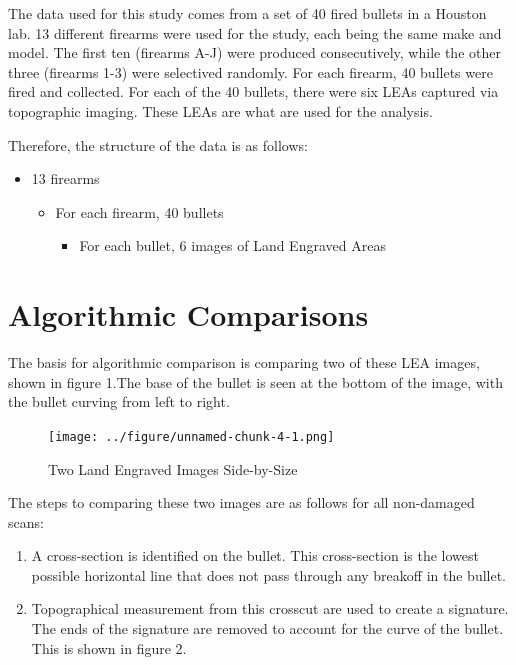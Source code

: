 \documentclass[
  number]{elsarticle}
\providecommand{\tightlist}{%
  \setlength{\itemsep}{0pt}\setlength{\parskip}{0pt}}\usepackage{longtable,booktabs,array}
\begin{document}
The data used for this study comes from a set of 40 fired bullets in a
Houston lab. 13 different firearms were used for the study, each being
the same make and model. The first ten (firearms A-J) were produced
consecutively, while the other three (firearms 1-3) were selectived
randomly. For each firearm, 40 bullets were fired and collected. For
each of the 40 bullets, there were six LEAs captured via topographic
imaging. These LEAs are what are used for the analysis.

Therefore, the structure of the data is as follows:

\begin{itemize}
\tightlist
\item
  13 firearms

  \begin{itemize}
  \tightlist
  \item
    For each firearm, 40 bullets

    \begin{itemize}
    \tightlist
    \item
      For each bullet, 6 images of Land Engraved Areas
    \end{itemize}
  \end{itemize}
\end{itemize}

\hypertarget{algorithmic-comparisons}{%
\section{Algorithmic Comparisons}\label{algorithmic-comparisons}}

The basis for algorithmic comparison is comparing two of these LEA
images, shown in figure 1.The base of the bullet is seen at the bottom
of the image, with the bullet curving from left to right.

\begin{figure}[H]

{\centering \texttt{[image: ../figure/unnamed-chunk-4-1.png]}

}

\caption{Two Land Engraved Images Side-by-Size}

\end{figure}

The steps to comparing these two images are as follows for all
non-damaged scans:

\begin{enumerate}
\def\labelenumi{\arabic{enumi}.}
\tightlist
\item
  A cross-section is identified on the bullet. This cross-section is the
  lowest possible horizontal line that does not pass through any
  breakoff in the bullet.
\item
  Topographical measurement from this crosscut are used to create a
  signature. The ends of the signature are removed to account for the
  curve of the bullet. This is shown in figure 2.
\end{enumerate}
\end{document}

